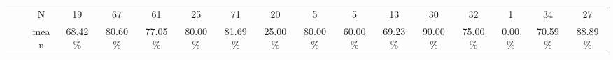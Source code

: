 \documentclass{sigchi}
\begin{document}
\begin{table}[t]
\begin{adjustbox}{width=1\textwidth}
\begin{tabular}{ccccccccccccccccc}
			\multicolumn{1}{|l|}{}                               & \multicolumn{1}{c|}{}                        & \multicolumn{1}{c|}{N}     & \multicolumn{1}{c|}{19}                                   & \multicolumn{1}{c|}{67}                                  & \multicolumn{1}{c|}{61}                                   & \multicolumn{1}{c|}{25}                                  & \multicolumn{1}{c|}{\cellcolor[HTML]{ACDDAA}71}                & \multicolumn{1}{c|}{\cellcolor[HTML]{ACDDAA}20}             & \multicolumn{1}{c|}{5}                                & \multicolumn{1}{c|}{5}                               & \multicolumn{1}{c|}{13}                              & \multicolumn{1}{c|}{30}                              & \multicolumn{1}{c|}{32}                              & \multicolumn{1}{c|}{1}                               & \multicolumn{1}{c|}{\cellcolor[HTML]{FFFFC7}34}           & \multicolumn{1}{c|}{\cellcolor[HTML]{FFFFC7}27}          \\ \cline{3-17} 
			\multicolumn{1}{|l|}{}                               & \multicolumn{1}{c|}{}                        & \multicolumn{1}{c|}{mean}  & \multicolumn{1}{c|}{68.42\%}                              & \multicolumn{1}{c|}{80.60\%}                             & \multicolumn{1}{c|}{77.05\%}                              & \multicolumn{1}{c|}{80.00\%}                             & \multicolumn{1}{c|}{\cellcolor[HTML]{ACDDAA}81.69\%}           & \multicolumn{1}{c|}{\cellcolor[HTML]{ACDDAA}25.00\%}        & \multicolumn{1}{c|}{80.00\%}                          & \multicolumn{1}{c|}{60.00\%}                         & \multicolumn{1}{c|}{69.23\%}                         & \multicolumn{1}{c|}{90.00\%}                         & \multicolumn{1}{c|}{75.00\%}                         & \multicolumn{1}{c|}{0.00\%}                          & \multicolumn{1}{c|}{\cellcolor[HTML]{FFFFC7}70.59\%}      & \multicolumn{1}{c|}{\cellcolor[HTML]{FFFFC7}88.89\%}     \\ \cline{3-17} 

\end{tabular}
\end{adjustbox}
\end{table}
\end{document}
